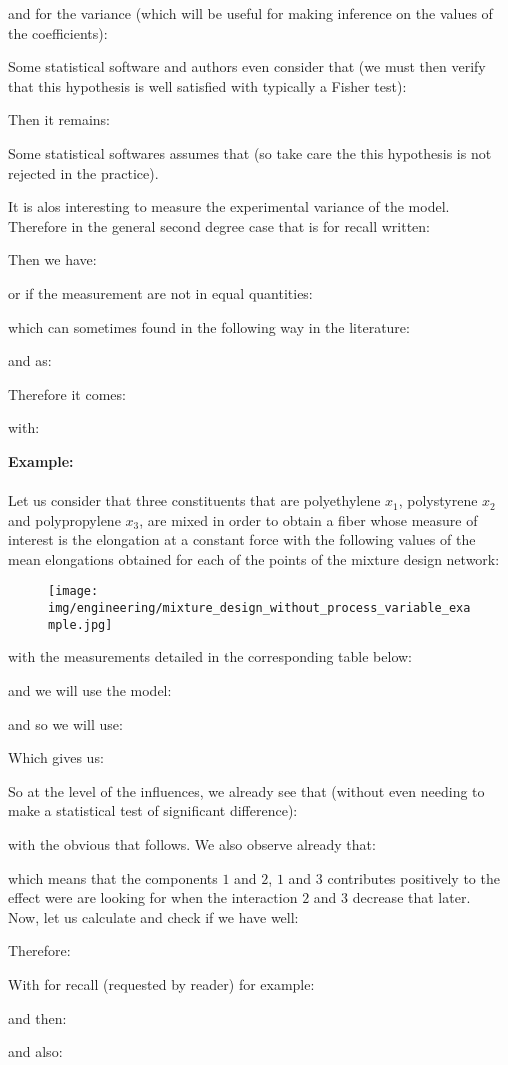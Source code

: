  	and for the variance (which will be useful for making inference on the values of the coefficients):
 	
	Some statistical software and authors even consider that (we must then verify that this hypothesis is well satisfied with typically a Fisher test):
	
	Then it remains:
	
	Some statistical softwares assumes that (so take care the this hypothesis is not rejected in the practice).
	
	It is alos interesting to measure the experimental variance of the model. Therefore in the general second degree case that is for recall written:
	
	Then we have:
	
	or if the measurement are not in equal quantities:
	
	which can sometimes found in the following way in the literature:
	
	and as:
	
	Therefore it comes:
	
	with:
	
	
	\begin{tcolorbox}[colframe=black,colback=white,sharp corners]
	\textbf{{\Large {}}Example:}\\\\
	Let us consider that three constituents that are polyethylene $x_1$, polystyrene $x_2$ and polypropylene $x_3$, are mixed in order to obtain a fiber whose measure of interest is the elongation at a constant force with the following values of the mean elongations obtained for each of the points of the mixture design network:
	\begin{figure}[H]
		\centering
		\texttt{[image: img/engineering/mixture\_design\_without\_process\_variable\_example.jpg]}	
	\end{figure}
	with the measurements detailed in the corresponding table below:
	
	and we will use the model:
	
 	and so we will use:
	
 	Which gives us:
	\end{tcolorbox}
	
	\begin{tcolorbox}[colframe=black,colback=white,sharp corners]
	
	So at the level of the influences, we already see that (without even needing to make a statistical test of significant difference):
	
	with the obvious that follows. We also observe already that:
	
	which means that the components $1$ and $2$, $1$ and $3$ contributes positively to the effect were are looking for when the interaction $2$ and $3$ decrease that later.\\

	Now, let us calculate and check if we have well:
	
	Therefore:
	
	With for recall (requested by reader) for example:
	
	and then:
	
	and also:
	\end{tcolorbox}
	
